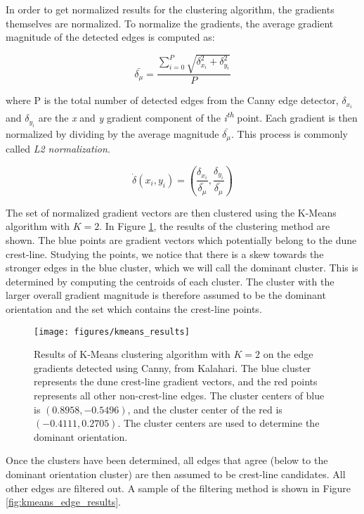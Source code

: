  In order to get normalized results for the clustering algorithm, the gradients themselves are normalized. To normalize the gradients, the average gradient magnitude of the detected edges is computed as:
 
 \begin{equation}
  \bar{\delta_{\mu}}=\frac{\sum_{i=0}^{P}\sqrt{\delta_{x_{i}}^{2}+\delta_{y_{i}}^{2}}}{P}
 \end{equation}

 where P is the total number of detected edges from the Canny edge detector, $\delta_{x_{i}}$ and $\delta_{y_{i}}$ are the \emph{x} and \emph{y} gradient component of the \emph{i\textsuperscript{th}} point. Each gradient is then normalized by dividing by the average magnitude $\bar{\delta_{\mu}}$. This process is commonly called \emph{L2 normalization}.  

 \begin{equation}
 \dot{\delta}\left(x_{i},y_{i}\right)=\left(\frac{\delta_{x_{i}}}{\bar{\delta_{\mu}}},\frac{\delta_{y_{i}}}{\bar{\delta_{\mu}}}\right)
 \end{equation}

 The set of normalized gradient vectors are then clustered using the K-Means algorithm with $K=2$. In Figure \ref{fig:kmeans_results}, the results of the clustering method are shown. The blue points are gradient vectors which potentially belong to the dune crest-line. Studying the points, we notice that there is a skew towards the stronger edges in the blue cluster, which we will call the dominant cluster. This is determined by computing the centroids of each cluster. The cluster with the larger overall gradient magnitude is therefore assumed to be the dominant orientation and the set which contains the crest-line points.
 
 \begin{figure}
 	\centering
 	\texttt{[image: figures/kmeans\_results]}
 	\caption{Results of K-Means clustering algorithm with $K=2$ on the edge gradients detected using Canny, from Kalahari. The blue cluster represents the dune crest-line gradient vectors, and the red points represents all other non-crest-line edges. The cluster centers of blue is $(0.8958, -0.5496)$, and the cluster center of the red is $(-0.4111, 0.2705)$. The cluster centers are used to determine the dominant orientation.}
 	\label{fig:kmeans_results}
 \end{figure}
 
 Once the clusters have been determined, all edges that agree (below to the dominant orientation cluster) are then assumed to be crest-line candidates. All other edges are filtered out. A sample of the filtering method is shown in Figure \ref{fig:kmeans_edge_results}.
 
